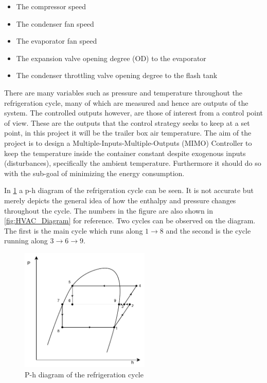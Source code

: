 \begin{itemize}
	\item The compressor speed
	\item The condenser fan speed
	\item The evaporator fan speed
	\item The expansion valve opening degree (OD) to the evaporator
	\item The condenser throttling valve opening degree to the flash tank
\end{itemize}

There are many variables such as pressure and temperature throughout the refrigeration cycle, many of which are measured and hence are outputs of the system. 
The controlled outputs however, are those of interest from a control point of view. These are the outputs that the control strategy seeks to keep at a set point, in this project it will be the trailer box air temperature. The aim of the project is to design a Multiple-Inputs-Multiple-Outputs (MIMO) Controller to keep the temperature inside the container constant despite exogenous inputs (disturbances), specifically the ambient temperature. Furthermore it should do so with the sub-goal of minimizing the energy consumption.


In \cref{fig:p-h_diagram} a p-h diagram of the refrigeration cycle can be seen. It is not accurate but merely depicts the general idea of how the enthalpy and pressure changes throughout the cycle. The numbers in the figure are also shown in \cref{fig:HVAC_Diagram} for reference. Two cycles can be observed on the diagram. The first is the main cycle which runs along $1 \rightarrow 8$ and the second is the cycle running along $3\rightarrow 6 \rightarrow 9$.

\begin{figure}[h!]
	\centering
	\includegraphics[width=0.55\textwidth]{Graphics/Flash_Tank_P-h_Diagram}
	\caption{P-h diagram of the refrigeration cycle}
	\label{fig:p-h_diagram}
\end{figure}





